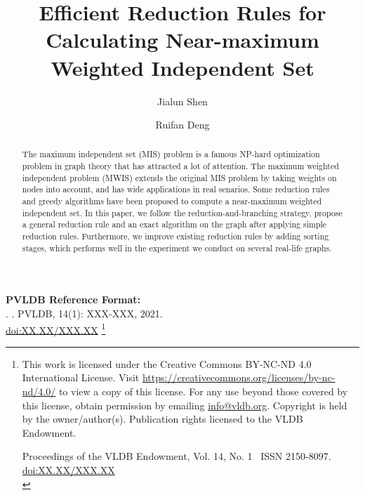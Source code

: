 \documentclass[sigconf, nonacm]{acmart}
\newcommand\vldbdoi{XX.XX/XXX.XX}{}
\newcommand\vldbpages{XXX-XXX}
\newcommand\vldbvolume{14}
\newcommand\vldbissue{1}
\newcommand\vldbyear{2021}
\newcommand\vldbauthors{\authors}
\newcommand\vldbtitle{\shorttitle}
\newcommand\vldbpagestyle{plain}
\begin{document}
\title{Efficient Reduction Rules for Calculating Near-maximum Weighted Independent Set}

\author{Jialun Shen}
\author{Ruifan Deng}

\begin{abstract}
The maximum independent set (MIS) problem is a famous NP-hard optimization problem in graph theory that has attracted a lot of attention. The maximum weighted independent problem (MWIS) extends the original MIS problem by taking weights on nodes into account, and has wide applications in real senarios. Some reduction rules and greedy algorithms have been proposed to compute a near-maximum weighted independent set. In this paper, we follow the reduction-and-branching strategy, propose a general reduction rule and an exact algorithm on the graph after applying simple reduction rules. Furthermore, we improve existing reduction rules by adding sorting stages, which performs well in the experiment we conduct on several real-life graphs.
\end{abstract}

\maketitle

\pagestyle{\vldbpagestyle}
\begingroup\small\noindent\raggedright\textbf{PVLDB Reference Format:}\\
\vldbauthors. \vldbtitle. PVLDB, \vldbvolume(\vldbissue): \vldbpages, \vldbyear.\\
\href{https://doi.org/\vldbdoi}{doi:\vldbdoi}
\endgroup
\begingroup
\renewcommand\thefootnote{}\footnote{\noindent
This work is licensed under the Creative Commons BY-NC-ND 4.0 International License. Visit \url{https://creativecommons.org/licenses/by-nc-nd/4.0/} to view a copy of this license. For any use beyond those covered by this license, obtain permission by emailing \href{mailto:info@vldb.org}{info@vldb.org}. Copyright is held by the owner/author(s). Publication rights licensed to the VLDB Endowment. \\
\raggedright Proceedings of the VLDB Endowment, Vol. \vldbvolume, No. \vldbissue\ %
ISSN 2150-8097. \\
\href{https://doi.org/\vldbdoi}{doi:\vldbdoi} \\
}\addtocounter{footnote}{-1}\endgroup
\end{document}

